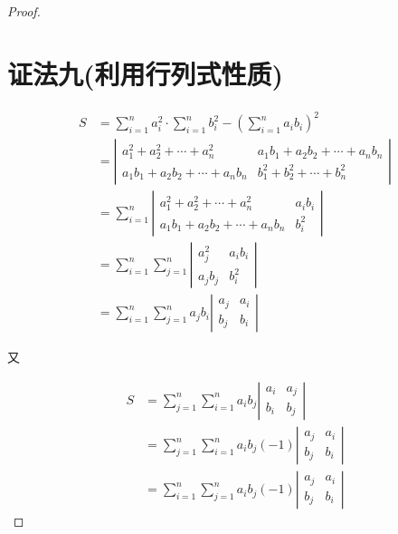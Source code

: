 \begin{proof}
	\section*{证法九(利用行列式性质)}
	$$
	\begin{aligned}
	S & =\sum_{i=1}^{n} a_{i}^{2} \cdot \sum_{i=1}^{n} b_{i}^{2}-\left(\sum_{i=1}^{n} a_{i} b_{i}\right)^{2} \\
	& =\left|\begin{array}{cc}
	a_{1}^{2}+a_{2}^{2}+\cdots+a_{n}^{2} & a_{1} b_{1}+a_{2} b_{2}+\cdots+a_{n} b_{n} \\
	a_{1} b_{1}+a_{2} b_{2}+\cdots+a_{n} b_{n} & b_{1}^{2}+b_{2}^{2}+\cdots+b_{n}^{2}
	\end{array}\right| \\
	& =\sum_{i=1}^{n}\left|\begin{array}{cc}
	a_{1}^{2}+a_{2}^{2}+\cdots+a_{n}^{2} & a_{i} b_{i} \\
	a_{1} b_{1}+a_{2} b_{2}+\cdots+a_{n} b_{n} & b_{i}^{2}
	\end{array}\right| \\
	& =\sum_{i=1}^{n} \sum_{j=1}^{n}\left|\begin{array}{cc}
	a_{j}^{2} & a_{i} b_{i} \\
	a_{j} b_{j} & b_{i}^{2}
	\end{array}\right| \\
	& =\sum_{i=1}^{n} \sum_{j=1}^{n} a_{j} b_{i}\left|\begin{array}{cc}
	a_{j} & a_{i} \\
	b_{j} & b_{i}
	\end{array}\right|
	\end{aligned}
	$$
	
	又
	
	$$
	\begin{aligned}
	S & =\sum_{j=1}^{n} \sum_{i=1}^{n} a_{i} b_{j}\left|\begin{array}{cc}
	a_{i} & a_{j} \\
	b_{i} & b_{j}
	\end{array}\right| \\
	& =\sum_{j=1}^{n} \sum_{i=1}^{n} a_{i} b_{j}(-1)\left|\begin{array}{cc}
	a_{j} & a_{i} \\
	b_{j} & b_{i}
	\end{array}\right| \\
	& =\sum_{i=1}^{n} \sum_{j=1}^{n} a_{i} b_{j}(-1)\left|\begin{array}{cc}
	a_{j} & a_{i} \\
	b_{j} & b_{i}
	\end{array}\right|
	\end{aligned}
	$$
	

\end{proof}
